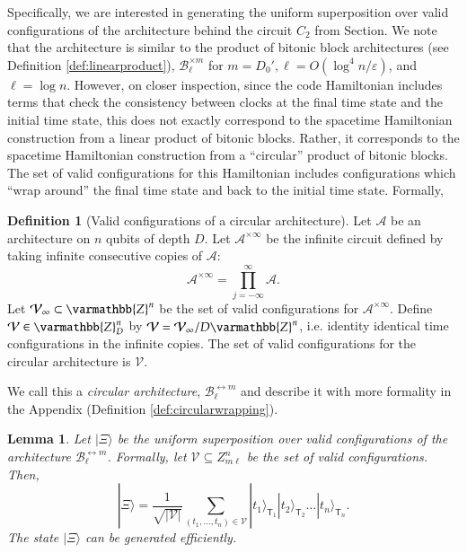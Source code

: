 \documentclass[11pt,letterpaper]{article}
\newtheorem{lemma}[theorem]{Lemma}
\theoremstyle{definition}
\newtheorem{definition}[theorem]{Definition}
\theoremstyle{remark}
\let\mathbb\varmathbb
\newcommand{\abs}[1]{\lvert#1\rvert}
\newcommand{\cA}{\mathcal A}
\newcommand{\cB}{\mathcal B}
\newcommand{\cV}{\mathcal V}
\let\epsilon=\varepsilon
\numberwithin{equation}{section}
\newcommand{\eps}{\epsilon}
\theoremstyle{definition}
\newcommand{\ket}[1]{|#1\rangle}
\newcommand{\sT}{{\mathsf{T}}}
\begin{document}
Specifically, we are interested in generating the uniform superposition over valid configurations of the architecture behind the circuit $C_2$ from Section. We note that the architecture is similar to the product of bitonic block architectures (see Definition \ref{def:linearproduct}), $\cB_\ell^{\times m}$ for $m = D_0',\ell = O(\log^4 n / \eps)$, and $\ell = \log n$. However, on closer inspection, since the code Hamiltonian includes terms that check the consistency between clocks at the final time state and the initial time state, this does not exactly correspond to the spacetime Hamiltonian construction from a linear product of bitonic blocks. Rather, it corresponds to the spacetime Hamiltonian construction from a ``circular'' product of bitonic blocks. The set of valid configurations for this Hamiltonian includes configurations which ``wrap around'' the final time state and back to the initial time state. Formally,

\begin{definition}[Valid configurations of a circular architecture]
Let $\cA$ be an architecture on $n$ qubits of depth $D$. Let $\cA^{\times \infty}$ be the infinite circuit defined by taking infinite consecutive copies of $\cA$:
\begin{equation}
\cA^{\times \infty} = \prod_{j = -\infty}^\infty \cA.
\end{equation}
Let $\cV_\infty \subset \mathbb{Z}^n$ be the set of valid configurations for $\cA^{\times \infty}$. Define $\cV \in \mathbb{Z}_D^n$ by $\cV = \cV_\infty / D \mathbb{Z}^n$, i.e. identity identical time configurations in the infinite copies. The set of valid configurations for the circular architecture is $\cV$.
\end{definition}

We call this a \emph{circular architecture}, $\cB_\ell^{\leftrightarrow m}$ and describe it with more formality in the Appendix (Definition \ref{def:circularwrapping}).

%

%
%
%
%
%
%
%

\begin{lemma}
Let $\ket \Xi$ be the uniform superposition over valid configurations of the architecture $\cB_\ell^{\leftrightarrow m}$. Formally, let $\cV \subseteq Z_{m\ell}^n$ be the set of valid configurations. Then,
\begin{equation}
\ket{\Xi} = \frac{1}{\sqrt{\abs{\cV}}} \sum_{(t_1, \ldots, t_n) \in \cV} \ket{t_1}_{\sT_1} \ket{t_2}_{\sT_2} \ldots \ket{t_n}_{\sT_n}.
\label{eq:superposition}
\end{equation}
The state $\ket{\Xi}$ can be generated efficiently.
\label{lem:buildtau}
\end{lemma}
\end{document}
